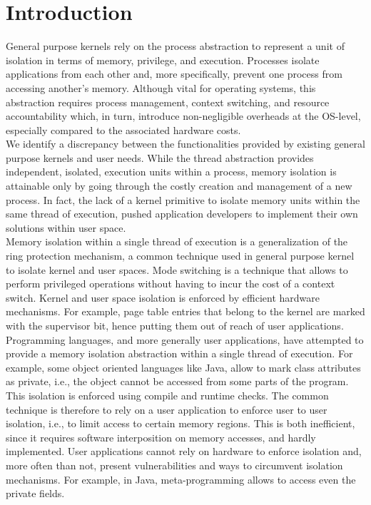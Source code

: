 \documentclass[letterpaper,twocolumn,10pt]{article}
\begin{document}
\section{Introduction}
General purpose kernels rely on the process abstraction to represent a unit of isolation in terms of memory, privilege, and execution.
Processes isolate applications from each other and, more specifically, prevent one process from accessing another's memory.
Although vital for operating systems, this abstraction requires process management, context switching, and resource accountability which, in turn, introduce non-negligible overheads at the OS-level, especially compared to the associated hardware costs. \\

We identify a discrepancy between the functionalities provided by existing general purpose kernels and user needs.
While the thread abstraction provides independent, isolated, execution units within a process, memory isolation is attainable only by going through the costly creation and management of a new process.
In fact, the lack of a kernel primitive to isolate memory units within the same thread of execution, pushed application developers to implement their own solutions within user space. \\

Memory isolation within a single thread of execution is a generalization of the ring protection mechanism, a common technique used in general purpose kernel to isolate kernel and user spaces.
Mode switching is a technique that allows to perform privileged operations without having to incur the cost of a context switch.
Kernel and user space isolation is enforced by efficient hardware mechanisms.
For example, page table entries that belong to the kernel are marked with the supervisor bit, hence putting them out of reach of user applications. \\

Programming languages, and more generally user applications, have attempted to provide a memory isolation abstraction within a single thread of execution.
For example, some object oriented languages like Java, allow to mark class attributes as private, i.e., the object cannot be accessed from some parts of the program.
This isolation is enforced using compile and runtime checks.
The common technique is therefore to rely on a user application to enforce user to user isolation, i.e., to limit access to certain memory regions.
This is both inefficient, since it requires software interposition on memory accesses, and hardly implemented.
User applications cannot rely on hardware to enforce isolation and, more often than not, present vulnerabilities and ways to circumvent isolation mechanisms.
For example, in Java, meta-programming allows to access even the private fields.\\
\end{document}
